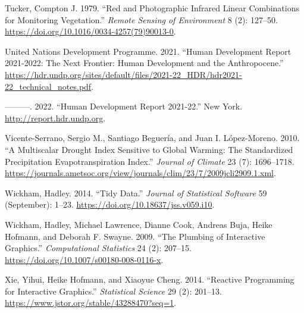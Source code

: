 \documentclass[
]{article}
\newlength{\cslhangindent}
\newlength{\cslentryspacingunit} %
\newenvironment{CSLReferences}[2] %
 {%
  \setlength{\parindent}{0pt}
  \ifodd #1
  \let\oldpar\par
  \def\par{\hangindent=\cslhangindent\oldpar}
  \fi
  \setlength{\parskip}{#2\cslentryspacingunit}
 }%
 {}
\begin{document}
\begin{CSLReferences}{1}{0}
\leavevmode{}%
Tucker, Compton J. 1979. {``Red and Photographic Infrared Linear
Combinations for Monitoring Vegetation.''} \emph{Remote Sensing of
Environment} 8 (2): 127--50.
\url{https://doi.org/10.1016/0034-4257(79)90013-0}.

\leavevmode{}%
United Nations Development Programme. 2021. {``Human Development Report
2021-2022: The Next Frontier: Human Development and the Anthropocene.''}
\url{https://hdr.undp.org/sites/default/files/2021-22_HDR/hdr2021-22_technical_notes.pdf}.

\leavevmode{}%
---------. 2022. {``Human Development Report 2021-22.''} New York.
\url{http://report.hdr.undp.org}.

\leavevmode{}%
Vicente-Serrano, Sergio M., Santiago Beguería, and Juan I. López-Moreno.
2010. {``A {Multiscalar} {Drought} {Index} {Sensitive} to {Global}
{Warming}: {The} {Standardized} {Precipitation} {Evapotranspiration}
{Index}.''} \emph{Journal of Climate} 23 (7): 1696--1718.
\url{https://journals.ametsoc.org/view/journals/clim/23/7/2009jcli2909.1.xml}.

\leavevmode{}%
Wickham, Hadley. 2014. {``Tidy {Data}.''} \emph{Journal of Statistical
Software} 59 (September): 1--23.
\url{https://doi.org/10.18637/jss.v059.i10}.

\leavevmode{}%
Wickham, Hadley, Michael Lawrence, Dianne Cook, Andreas Buja, Heike
Hofmann, and Deborah F. Swayne. 2009. {``The Plumbing of Interactive
Graphics.''} \emph{Computational Statistics} 24 (2): 207--15.
\url{https://doi.org/10.1007/s00180-008-0116-x}.

\leavevmode{}%
Xie, Yihui, Heike Hofmann, and Xiaoyue Cheng. 2014. {``Reactive
{Programming} for {Interactive} {Graphics}.''} \emph{Statistical
Science} 29 (2): 201--13.
\url{https://www.jstor.org/stable/43288470?seq=1}.

\end{CSLReferences}
\end{document}
